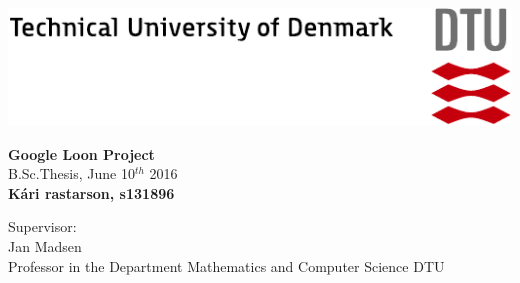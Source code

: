 \begin{titlepage}

\thispagestyle{empty}
\enlargethispage{1.3cm}

\vspace*{-1.9cm}
	
\includegraphics[width=\textwidth]{graphics/tex_dtu_uk_a1_cmyk.pdf}
	

\begin{raggedleft}

		
\Huge\textbf{Google Loon Project}\\[0.5cm]

\large{B.Sc.Thesis, June 10$^{th}$ 2016}\\[0.5cm]
\large \textbf{K\'ari \TH rastarson, s131896}\\[1.5cm]		
\end{raggedleft}			
\begin{raggedright}
\large Supervisor: \\
\Large Jan Madsen\\ 
\large Professor in the Department Mathematics and Computer Science DTU
\end{raggedright}


\end{titlepage}
	
